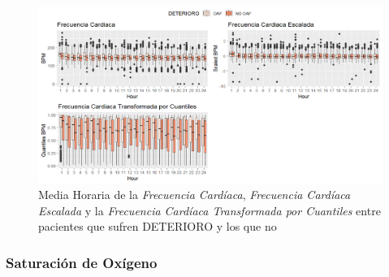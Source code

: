 \newpage
\thispagestyle{empty}
\begin{landscape}
\begin{figure}[H]
    \centering
    \includegraphics[scale = 0.68]{./img/fc-boxplot-mean.png}
    \caption{Media Horaria de la \textit{Frecuencia Cardíaca}, \textit{Frecuencia Cardíaca Escalada} y la \textit{Frecuencia Cardíaca Transformada por Cuantiles} entre pacientes que sufren DETERIORO y los que no}
    \label{fig:fc-boxplot-mean}
\end{figure}
\end{landscape}
\restoregeometry

\subsubsection{Saturación de Oxígeno}

